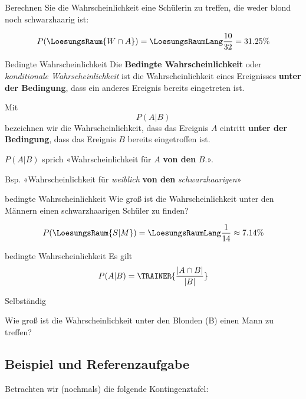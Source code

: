 Berechnen Sie die Wahrscheinlichkeit eine Schülerin zu treffen, die
weder blond noch schwarzhaarig ist:

\leserluft

$$P(\LoesungsRaum{W \cap A}) = \LoesungsRaumLang{\frac{10}{32} = 31.25\%}$$

\newpage


\begin{definition}{Bedingte Wahrscheinlichkeit}{}
Die \textbf{Bedingte Wahrscheinlichkeit} oder \textit{konditionale
  Wahrscheinlichkeit} ist die Wahrscheinlichkeit eines Ereignisses
\textbf{unter der Bedingung}, dass ein anderes Ereignis bereits
eingetreten ist.

  Mit
  $$P(A | B)$$
  bezeichnen wir die Wahrscheinlichkeit, dass das Ereignis $A$
  eintritt \textbf{unter der Bedingung}, dass das Ereignis $B$ bereits
  eingetroffen ist.
\end{definition}

\begin{bemerkung}{}{}
  $P(A|B)$ sprich «Wahrscheinlichkeit für $A$ \textbf{von den} $B$.».

  Bsp. «Wahrscheinlichkeit für \textit{weiblich} \textbf{von den} \textit{schwarzhaarigen}»  
\end{bemerkung}

\begin{beispiel}{bedingte Wahrscheinlichkeit}{}
  Wie groß ist die Wahrscheinlichkeit unter den Männern einen schwarzhaarigen Schüler zu finden?

  \leserluft

  $$P(\LoesungsRaum{S|M})  = \LoesungsRaumLang{\frac{1}{14} \approx 7.14\%}$$
\end{beispiel}

\begin{gesetz}{bedingte Wahrscheinlichkeit}{}
  Es gilt
  $$P(A|B) = \TRAINER{\frac{|A\cap B|}{|B|}}$$  
\end{gesetz}

Selbständig

Wie groß ist die Wahrscheinlichkeit unter den Blonden (B) einen Mann
zu treffen?

\newpage

\subsection{Beispiel und Referenzaufgabe}
Betrachten wir (nochmals) die folgende Kontingenztafel:

